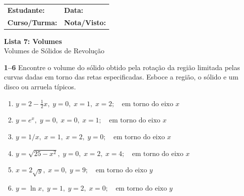 \documentclass[12pt,a4paper]{article}
\begin{document}
\begin{tcolorbox}[colback=bglight, colframe=primary, boxrule=1pt, arc=3pt]
  \sffamily\small
  \begin{tabular}{@{}p{} p{}@{}}
    \textbf{Estudante:} \hrulefill & \textbf{Data:} \hrulefill \\[0.25cm]
    \textbf{Curso/Turma:} \hrulefill & \textbf{Nota/Visto:} \hrulefill
  \end{tabular}
\end{tcolorbox}

\begin{center}
  {\LARGE\bfseries\color{primary} Lista 7: Volumes} \\[0.1cm]
  {\small\sffamily\color{gray} Volumes de Sólidos de Revolução}
\end{center}

\vspace{0.2cm}



\textbf{1--6} Encontre o volume do sólido obtido pela rotação da região limitada pelas curvas dadas em torno das retas especificadas. Esboce a região, o sólido e um disco ou arruela típicos.

\begin{enumerate}
    \item $y = 2 - \frac{1}{2}x, \; y = 0, \; x = 1, \; x = 2; \quad \text{em torno do eixo } x$
    \item $y = e^x, \; y = 0, \; x = 0, \; x = 1; \quad \text{em torno do eixo } x$
    \item $y = 1/x, \; x = 1, \; x = 2, \; y = 0; \quad \text{em torno do eixo } x$
    \item $y = \sqrt{25 - x^2}, \; y = 0, \; x = 2, \; x = 4; \quad \text{em torno do eixo } x$
    \item $x = 2\sqrt{y}, \; x = 0, \; y = 9; \quad \text{em torno do eixo } y$
    \item $y = \ln x, \; y = 1, \; y = 2, \; x = 0; \quad \text{em torno do eixo } y$
\end{enumerate}
\end{document}
